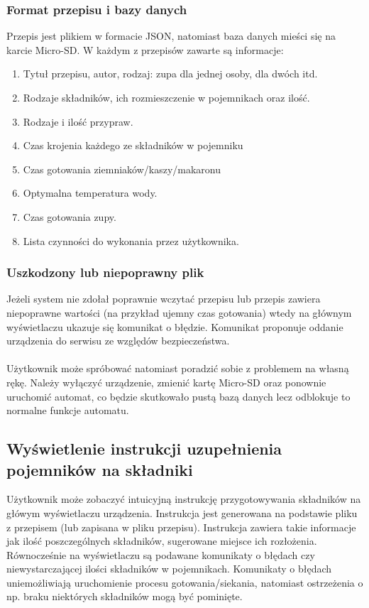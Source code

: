 \documentclass[12pt,a4paper,notitlepage]{article}
\begin{document}
\subsubsection{Format przepisu i bazy danych}
Przepis jest plikiem w formacie JSON, natomiast baza danych mieści się na karcie Micro-SD. W każdym z przepisów zawarte są informacje:
\begin{enumerate}
  \item Tytuł przepisu, autor, rodzaj: zupa dla jednej osoby, dla dwóch itd.
  \item Rodzaje składników, ich rozmieszczenie w pojemnikach oraz ilość.
  \item Rodzaje i ilość przypraw.
  \item Czas krojenia każdego ze składników w pojemniku
  \item Czas gotowania ziemniaków/kaszy/makaronu
  \item Optymalna temperatura wody.
  \item Czas gotowania zupy.
  \item Lista czynności do wykonania przez użytkownika.
\end{enumerate}

\subsubsection{Uszkodzony lub niepoprawny plik}
Jeżeli system nie zdołał poprawnie wczytać przepisu lub przepis zawiera niepoprawne wartości (na przykład ujemny czas gotowania) wtedy na głównym wyświetlaczu ukazuje się komunikat o błędzie. Komunikat proponuje oddanie urządzenia do serwisu ze względów bezpieczeństwa.\\ \\
Użytkownik może spróbować natomiast poradzić sobie z problemem na własną rękę. Należy wyłączyć urządzenie, zmienić kartę Micro-SD oraz ponownie uruchomić automat, co będzie skutkowało pustą bazą danych lecz odblokuje to normalne funkcje automatu.

\subsection{Wyświetlenie instrukcji uzupełnienia pojemników na składniki}
Użytkownik może zobaczyć intuicyjną instrukcję przygotowywania składników na główym wyświetlaczu urządzenia. Instrukcja jest generowana na podstawie pliku z przepisem (lub zapisana w pliku przepisu). Instrukcja zawiera takie informacje jak ilość poszczególnych składników, sugerowane miejsce ich rozłożenia. Równocześnie na wyświetlaczu są podawane komunikaty o błędach czy niewystarczającej ilości składników w pojemnikach. Komunikaty o błędach uniemożliwiają uruchomienie procesu gotowania/siekania, natomiast ostrzeżenia o np. braku niektórych składników mogą być pominięte.
\end{document}
